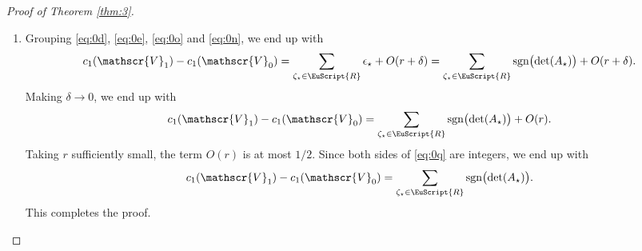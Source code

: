 \documentclass[10pt]{amsart}
\let\pazocal\EuScript
\theoremstyle{definition}
\DeclareMathOperator{\sgn}{sgn}
\newcommand{\RRR}{\pazocal{R}}
\newcommand{\VVV}{{\mathscr{V}}}
\newcommand{\R}{\mathbb{R}}
\newcommand{\txi}{{\tilde{\xi}}}
\newcommand{\tb}{{\tilde{b}}}
\newcommand{\matrice}[1]{\arraycolsep3.5pt\begin{bmatrix}#1\end{bmatrix}}
\begin{document}
\begin{proof}[Proof of Theorem \ref{thm:3}]
\begin{enumerate}
We define more appropriate coordinates
\begin{equation}\label{eq:0k}
\txi_1 = \dfrac{t_{12}\delta + t_{22}\xi_1}{t_{11}\delta}, \quad \txi_2 = \dfrac{t_{13}\delta + t_{23}\xi_1 + t_{33}\xi_2}{t_{11}\delta}.
\end{equation}
Using invariance of two-forms under change of coordinates, $b_0(\xi)d\xi = \tb_0(\txi)d\txi$, where $\tb_0(\pm \delta,\txi) d\xi$ is the two-form associated to the negative eigenspace of
\[
\epsilon_\star \delta \cdot t_{11} \bigl( \sigma_1 + \sigma_2 \txi_1 + \sigma_3 \txi_2 \bigr).
\]
This setup allows us to apply \cite[(23)]{FC13}, which gives:
\begin{equation*}
\tb_0(\pm \delta,\txi) = \dfrac{i\epsilon_\star^3 (\pm\delta)^3}{2\delta^3\bigl(\txi^2_1 + \txi_2^2 + 1\bigr)^{3/2}} \matrice{1 \\ \txi_1\\ \txi_2 } \cdot \matrice{0 \\ 1 \\ 0} \wedge \matrice{0 \\ 0 \\ 1} = \dfrac{\pm\epsilon_\star}{2\bigl(\txi^2_1 + \txi_2^2 + 1\bigr)^{3/2}}.
\end{equation*}
Under the change of coordinates \eqref{eq:0k}, the disk $|\xi| \leq r$ gets mapped to an ellipse centered at distance $O(1)$ from the origin, of dimensions $\sim \delta^{-1}$. Thus,
\begin{equation}\label{eq:0n}
\int_{|\xi| \leq r} b_0(\pm\delta,\xi) d\xi = \int_{\R^2} b_0(\pm\delta,\xi) d\xi + O(\delta) = \pm \epsilon_\star \pi + O(\delta).
\end{equation}
We refer to the proof of \cite[Lem.\,2.5]{D19b} for details.

\item
Grouping \eqref{eq:0d}, \eqref{eq:0e}, \eqref{eq:0o} and \eqref{eq:0n}, we end up with
\begin{equation*}
c_1(\VVV_1)-c_1(\VVV_0) = \sum_{\zeta_\star \in \RRR} \epsilon_\star + O(r+\delta) = \sum_{\zeta_\star \in \RRR} \sgn\bigl(\det(A_\star)\bigr) + O(r+\delta).
\end{equation*}
Making $\delta \to 0$, we end up with
\begin{equation}\label{eq:0q}
c_1(\VVV_1)-c_1(\VVV_0) = \sum_{\zeta_\star \in \RRR} \sgn\bigl(\det(A_\star)\bigr) + O(r).
\end{equation}
Taking $r$ sufficiently small, the term $O(r)$ is at most $1/2$. Since both sides of \eqref{eq:0q} are integers, we end up with
\begin{equation*}
c_1(\VVV_1)-c_1(\VVV_0) = \sum_{\zeta_\star \in \RRR} \sgn\bigl(\det(A_\star)\bigr).
\end{equation*}
This completes the proof.\qedhere
\end{enumerate}
\end{proof}
\end{document}
